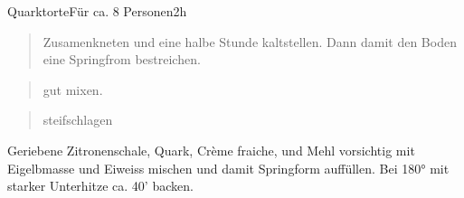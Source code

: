 \documentclass[
  a4paper,
]{article}
\begin{document}
\begin{recipe}{Quarktorte}{Für ca. 8 Personen}{2h}


\begin{quote}
Zusamenkneten und eine halbe Stunde kaltstellen. Dann damit den Boden
eine Springfrom bestreichen.
\end{quote}

\freeform\hrulefill


\begin{quote}
gut mixen.
\end{quote}

\freeform\hrulefill


\begin{quote}
steifschlagen
\end{quote}

\freeform\hrulefill


Geriebene Zitronenschale, Quark, Crème fraiche, und Mehl vorsichtig mit Eigelbmasse und Eiweiss mischen und damit Springform auffüllen. Bei 180° mit starker Unterhitze ca. 40' backen.

\freeform\hrulefill\newline\freeform{}\end{recipe}

\newpage
\end{document}
